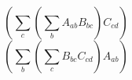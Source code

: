 \documentclass{article}
\begin{document}
\[\left(\sum_c \left(\sum_b A_{ab}B_{bc}\right)C_{cd}\right)\]
\[\left(\sum_b \left(\sum_c B_{bc}C_{cd}\right)A_{ab}\right)\]

 
\end{document}
